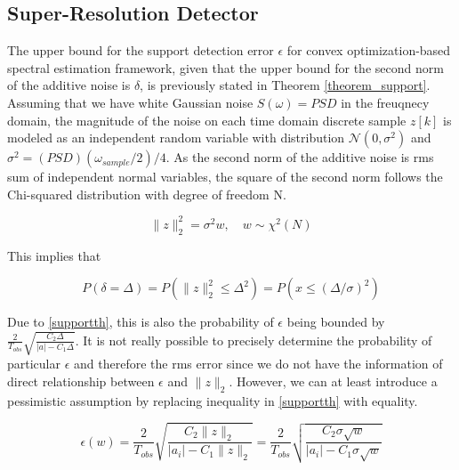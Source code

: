 \documentclass[11pt,journal, onecolumn]{IEEEtran}
\theoremstyle{theorem}
\begin{document}




\subsection{Super-Resolution Detector}


The upper bound for the support detection error $\epsilon$ for convex optimization-based spectral estimation framework, given that the upper bound for the second norm of the additive noise is $\delta$, is previously stated in Theorem \ref{theorem_support}. Assuming that we have white Gaussian noise $S(\omega)=PSD$ in the freuqnecy domain, the magnitude of the noise on each time domain discrete sample $z[k]$ is modeled as an independent random variable with distribution $\mathcal{N}(0, \sigma^2)$ and $\sigma^2 = (PSD)(\omega_{sample}/2)/4$. As the second norm of the additive noise is rms sum of independent normal variables, the square of the second norm follows the Chi-squared distribution with degree of freedom N. 

\begin{equation}
    \| z \|_2^2 = \sigma^2 w, \quad w\sim \chi^2(N) 
\end{equation}

\noindent This implies that 

\begin{equation}
   P(\delta=\Delta) = P(\| z \|_2^2\leq\Delta^2) = P(x\leq (\Delta/\sigma)^2)
\end{equation}

\noindent Due to \eqref{supportth}, this is also the probability of $\epsilon$ being bounded by $\frac{2}{T_{obs}}\sqrt{\frac{C_2\Delta}{|a|-C_1\Delta}}$. It is not really possible to precisely determine the probability of particular $\epsilon$ and therefore the rms error since we do not have the information of direct relationship between $\epsilon$ and $\| z \|_2$. However, we can at least introduce a pessimistic assumption by replacing inequality in \eqref{supportth} with equality.

\begin{equation}
    \epsilon(w) = \frac{2}{T_{obs}} \sqrt{\frac{C_2 \|z\|_2}{|a_i| - C_1 \|z\|_2}} = \frac{2}{T_{obs}} \sqrt{\frac{C_2 \sigma \sqrt{w}}{|a_i| - C_1 \sigma \sqrt{w} }} 
\end{equation}
\end{document}
